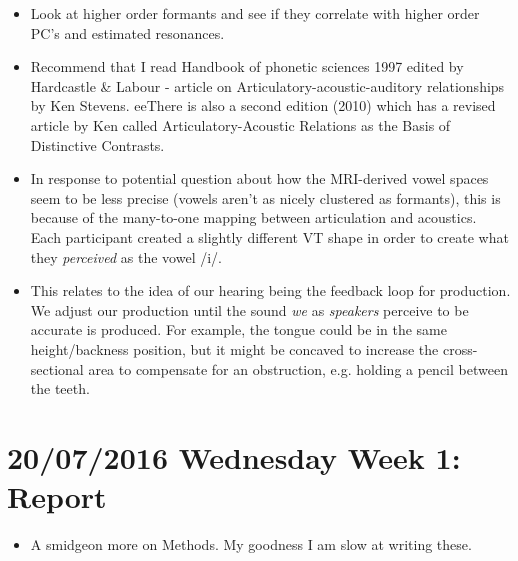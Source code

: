 \documentclass{article}
\begin{document}
\begin{itemize}
\begin{itemize}
\begin{itemize}
            \item Look at higher order formants and see if they correlate with higher order PC's and estimated resonances.
            \item Recommend that I read Handbook of phonetic sciences 1997 edited by Hardcastle \& Labour - article on Articulatory-acoustic-auditory relationships by Ken Stevens. eeThere is also a second edition (2010) which has a revised article by Ken called Articulatory-Acoustic Relations as the Basis of Distinctive Contrasts.
            \item In response to potential question about how the MRI-derived vowel spaces seem to be less precise (vowels aren't as nicely clustered as formants), this is because of the many-to-one mapping between articulation and acoustics. Each participant created a slightly different VT shape in order to create what they \textit{perceived} as the vowel /i/.
            \item This relates to the idea of our hearing being the feedback loop for production. We adjust our production until the sound \textit{we} as \textit{speakers} perceive to be accurate is produced. For example, the tongue could be in the same height/backness position, but it might be concaved to increase the cross-sectional area to compensate for an obstruction, e.g. holding a pencil between the teeth.
        \end{itemize} 
    \end{itemize}
\end{itemize}

\section*{20/07/2016 Wednesday Week 1: Report}
\begin{itemize}
    \item A smidgeon more on Methods. My goodness I am slow at writing these.
\end{itemize}
\end{document}
